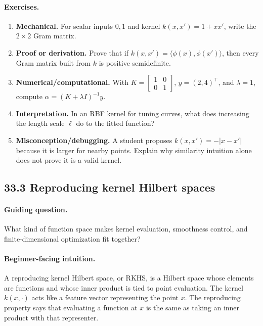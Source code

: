 \paragraph{Exercises.}
\begin{enumerate}[label=\textbf{33.2.\arabic*.}, leftmargin=*]
\item \textbf{Mechanical.} For scalar inputs \(0,1\) and kernel \(k(x,x')=1+xx'\), write the \(2\times2\) Gram matrix.
\item \textbf{Proof or derivation.} Prove that if \(k(x,x')=\langle\phi(x),\phi(x')\rangle\), then every Gram matrix built from \(k\) is positive semidefinite.
\item \textbf{Numerical/computational.} With \(K=\begin{bmatrix}1&0\\0&1\end{bmatrix}\), \(y=(2,4)^\top\), and \(\lambda=1\), compute \(\alpha=(K+\lambda I)^{-1}y\).
\item \textbf{Interpretation.} In an RBF kernel for tuning curves, what does increasing the length scale \(\ell\) do to the fitted function?
\item \textbf{Misconception/debugging.} A student proposes \(k(x,x')=-|x-x'|\) because it is larger for nearby points. Explain why similarity intuition alone does not prove it is a valid kernel.
\end{enumerate}

\subsection{33.3 Reproducing kernel Hilbert spaces}

\paragraph{Guiding question.}
What kind of function space makes kernel evaluation, smoothness control, and finite-dimensional optimization fit together?

\paragraph{Beginner-facing intuition.}
A reproducing kernel Hilbert space, or RKHS, is a Hilbert space whose elements are functions and whose inner product is tied to point evaluation. The kernel \(k(x,\cdot)\) acts like a feature vector representing the point \(x\). The reproducing property says that evaluating a function at \(x\) is the same as taking an inner product with that representer.

